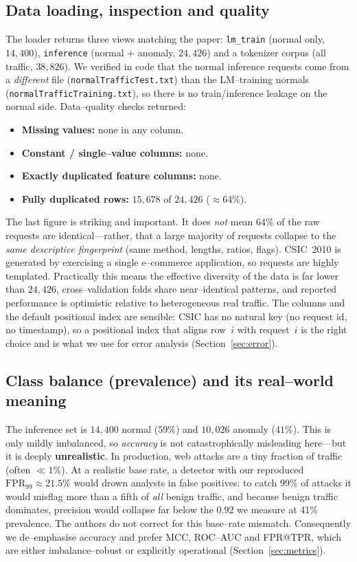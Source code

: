 \documentclass[11pt,a4paper]{article}
\begin{document}
\subsection{Data loading, inspection and quality}
\label{sec:eda-dupes}
The loader returns three views matching the paper: \texttt{lm\_train} (normal only,
$14{,}400$), \texttt{inference} (normal $+$ anomaly, $24{,}426$) and a tokenizer corpus
(all traffic, $38{,}826$). We verified in code that the normal inference requests come
from a \emph{different} file (\texttt{normalTrafficTest.txt}) than the LM--training
normals (\texttt{normalTrafficTraining.txt}), so there is no train/inference leakage on
the normal side. Data--quality checks returned:
\begin{itemize}[nosep,leftmargin=1.4em]
  \item \textbf{Missing values:} none in any column.
  \item \textbf{Constant / single--value columns:} none.
  \item \textbf{Exactly duplicated feature columns:} none.
  \item \textbf{Fully duplicated rows:} $15{,}678$ of $24{,}426$ ($\approx$64\%).
\end{itemize}
The last figure is striking and important. It does \emph{not} mean 64\% of the raw
requests are identical---rather, that a large majority of requests collapse to the
\emph{same descriptive fingerprint} (same method, lengths, ratios, flags). CSIC~2010 is
generated by exercising a single e--commerce application, so requests are highly
templated. Practically this means the effective diversity of the data is far lower than
$24{,}426$, cross--validation folds share near--identical patterns, and reported
performance is optimistic relative to heterogeneous real traffic. The columns and the
default positional index are sensible: CSIC has no natural key (no request id, no
timestamp), so a positional index that aligns row~$i$ with request~$i$ is the right
choice and is what we use for error analysis (Section~\ref{sec:error}).

\subsection{Class balance (prevalence) and its real--world meaning}
\label{sec:eda-balance}
The inference set is $14{,}400$ normal ($59\%$) and $10{,}026$ anomaly ($41\%$). This is
only mildly imbalanced, so \emph{accuracy} is not catastrophically misleading here---but
it is deeply \textbf{unrealistic}. In production, web attacks are a tiny fraction of
traffic (often $\ll1\%$). At a realistic base rate, a detector with our reproduced
$\text{FPR}_{99}\approx21.5\%$ would drown analysts in false positives: to catch 99\% of
attacks it would misflag more than a fifth of \emph{all} benign traffic, and because
benign traffic dominates, precision would collapse far below the $0.92$ we measure at
41\% prevalence. The authors do not correct for this base--rate mismatch. Consequently we
de--emphasise accuracy and prefer MCC, ROC--AUC and FPR@TPR, which are either
imbalance--robust or explicitly operational (Section~\ref{sec:metrics}).
\end{document}
